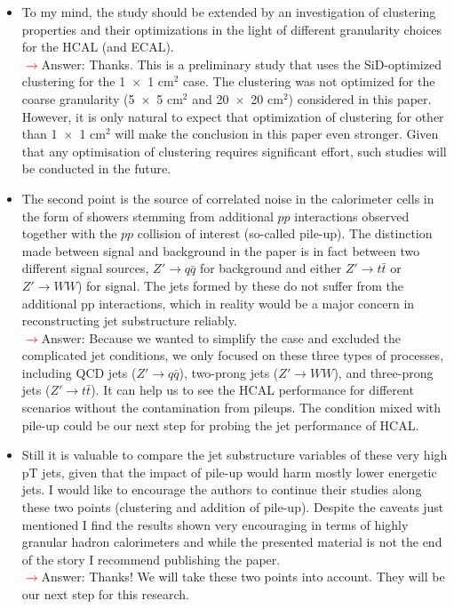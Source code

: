 \documentclass[final,1p,11pt]{elsarticle}
\begin{document}
\begin{itemize}
\item To my mind, the study should be extended by an investigation of clustering properties and their optimizations in the light of different granularity choices for the HCAL (and ECAL).\\
 \textcolor{red}{$\rightarrow$}Answer: Thanks. This is a preliminary study that uses the SiD-optimized clustering for the 1~$\times$~1 cm$^2$ case. The clustering was not optimized for the coarse granularity (5~$\times$~5 cm$^2$ and 20~$\times$~20 cm$^2$) considered in this paper. However, it is only natural to expect that optimization of clustering for other than 1~$\times$~1 cm$^2$ will make the conclusion in this paper even stronger. Given that any optimisation of clustering requires significant effort, such studies will be conducted in the future.\\
\item The second point is the source of correlated noise in the calorimeter cells in the form of showers stemming from additional $pp$ interactions observed together with the $pp$ collision of interest (so-called pile-up). The distinction made between signal and background in the paper is in fact between two different signal sources, $Z'\rightarrow q\bar{q}$ for background and either $Z' \rightarrow t\bar{t}$ or $Z' \rightarrow WW$) for signal. The jets formed by these do not suffer from the additional pp interactions, which in reality would be a major concern in reconstructing jet substructure reliably.\\
 \textcolor{red}{$\rightarrow$}Answer: Because we wanted to simplify the case and excluded the complicated jet conditions, we only focused on these three types of processes, including
QCD jets ($Z'\rightarrow q\bar{q}$), two-prong jets ($Z' \rightarrow WW$), and three-prong jets ($Z' \rightarrow t\bar{t}$).
It can help us to see the HCAL performance for different scenarios without 
the contamination from pileups. The condition mixed with pile-up could be our next step
for probing the jet performance of HCAL.
\item Still it is valuable to compare the jet substructure variables of these very high pT jets, given that the impact of pile-up would harm mostly lower energetic jets. I would like to encourage the authors to continue their studies along these two points (clustering and addition of pile-up). Despite the caveats just mentioned I find the results shown very encouraging in terms of highly granular hadron calorimeters and while the presented material is not the end of the story I recommend publishing the paper.\\
 \textcolor{red}{$\rightarrow$}Answer: Thanks! We will take these two points into account. They will be our next step for this research. 
\end{itemize}
\end{document}

